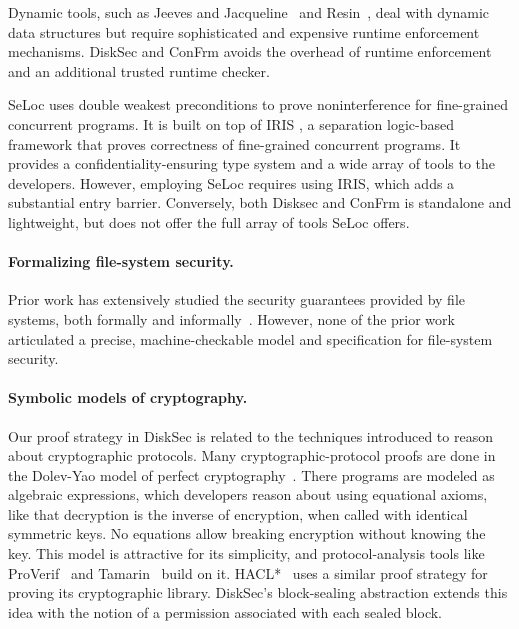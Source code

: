 
Dynamic tools, such as Jeeves and Jacqueline~\cite{yang:jeeves, yang:jacqueline}
and Resin~\cite{yip:resin}, deal with dynamic data structures but
require sophisticated and expensive runtime enforcement mechanisms. DiskSec and ConFrm avoids
the overhead of runtime enforcement and an additional trusted runtime checker.

SeLoc \cite{seloc} uses double weakest preconditions to prove noninterference for fine-grained concurrent programs. It is built on top of IRIS \cite{iris}, a separation logic-based framework that proves correctness of fine-grained concurrent programs. It provides a confidentiality-ensuring type system and a wide array of tools to the developers. However, employing SeLoc requires using IRIS, which adds a substantial entry barrier. Conversely, both Disksec and ConFrm is standalone and lightweight, but does not offer the full array of tools SeLoc offers. 

\paragraph{Formalizing file-system security.}

Prior work has extensively studied the security
guarantees provided by file systems, both formally and
informally~\cite{posix-security}.  However, none of the prior
work articulated a precise, machine-checkable model and specification
for file-system security.

\paragraph{Symbolic models of cryptography.}

Our proof strategy in DiskSec is related to the techniques introduced to reason about
cryptographic protocols.  Many cryptographic-protocol proofs are done
in the Dolev-Yao model of perfect cryptography~\cite{dolev:protocols}.
There programs are modeled as algebraic expressions, which developers reason
about using equational axioms, like that decryption is the inverse of
encryption, when called with identical symmetric keys.  No equations
allow breaking encryption without knowing the key.  This model is
attractive for its simplicity, and protocol-analysis tools like
ProVerif~\cite{blanchet:proverif} and Tamarin~\cite{schmidt:tamarin}
build on it.  HACL*~\cite{zinzindohoue:haclstar} uses a similar proof
strategy for proving its cryptographic library. DiskSec's block-sealing
abstraction extends this idea with the notion of a permission associated
with each sealed block.


